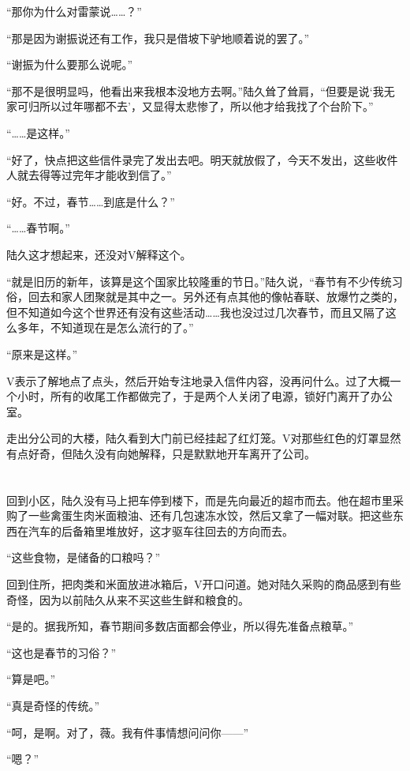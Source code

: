 “那你为什么对雷蒙说……？”

“那是因为谢振说还有工作，我只是借坡下驴地顺着说的罢了。”

“谢振为什么要那么说呢。”

“那不是很明显吗，他看出来我根本没地方去啊。”陆久耸了耸肩，“但要是说‘我无家可归所以过年哪都不去’，又显得太悲惨了，所以他才给我找了个台阶下。”

“……是这样。”

“好了，快点把这些信件录完了发出去吧。明天就放假了，今天不发出，这些收件人就去得等过完年才能收到信了。”

“好。不过，春节……到底是什么？”

“……春节啊。”

陆久这才想起来，还没对V解释这个。

“就是旧历的新年，该算是这个国家比较隆重的节日。”陆久说，“春节有不少传统习俗，回去和家人团聚就是其中之一。另外还有点其他的像帖春联、放爆竹之类的，但不知道如今这个世界还有没有这些活动……我也没过过几次春节，而且又隔了这么多年，不知道现在是怎么流行的了。”

“原来是这样。”

V表示了解地点了点头，然后开始专注地录入信件内容，没再问什么。过了大概一个小时，所有的收尾工作都做完了，于是两个人关闭了电源，锁好门离开了办公室。

走出分公司的大楼，陆久看到大门前已经挂起了红灯笼。V对那些红色的灯罩显然有点好奇，但陆久没有向她解释，只是默默地开车离开了公司。

\section*{}

回到小区，陆久没有马上把车停到楼下，而是先向最近的超市而去。他在超市里采购了一些禽蛋生肉米面粮油、还有几包速冻水饺，然后又拿了一幅对联。把这些东西在汽车的后备箱里堆放好，这才驱车往回去的方向而去。

“这些食物，是储备的口粮吗？”

回到住所，把肉类和米面放进冰箱后，V开口问道。她对陆久采购的商品感到有些奇怪，因为以前陆久从来不买这些生鲜和粮食的。

“是的。据我所知，春节期间多数店面都会停业，所以得先准备点粮草。”

“这也是春节的习俗？”

“算是吧。”

“真是奇怪的传统。”

“呵，是啊。对了，薇。我有件事情想问问你——”

“嗯？”

